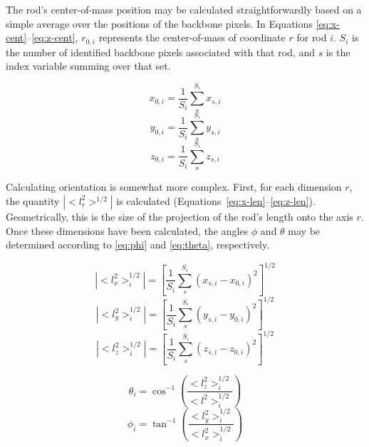 The rod's center-of-mass position may be calculated
straightforwardly based on a simple average over the positions of the backbone pixels.  In 
Equations \ref{eq:x-cent}--\ref{eq:z-cent}, $r_{0,i}$ represents the center-of-mass of coordinate $r$ for 
rod $i$.  $S_i$ is the number of identified backbone pixels associated with that rod, and $s$ is the index
variable summing over that set.

\begin{equation}
\label{eq:x-cent}
x_{0,i} = \frac{1}{S_i} \sum_{s}^{S_i} x_{s,i}
\end{equation}
\begin{equation}
\label{eq:y-cent}
y_{0,i} = \frac{1}{S_i} \sum_{s}^{S_i} y_{s,i}
\end{equation}
\begin{equation}
\label{eq:z-cent}
z_{0,i} = \frac{1}{S_i} \sum_{s}^{S_i} z_{s,i} 
\end{equation}

Calculating orientation is somewhat more complex.  First, for each dimension $r$, the quantity
$|<l_r^2>^{1/2}|$ is calculated (Equations~\ref{eq:x-len}--\ref{eq:z-len}). 
Geometrically, this is the size of the projection of the rod's length
onto the axis $r$.
Once these dimensions have been calculated, the angles $\phi$ and $\theta$ may be 
determined according to \ref{eq:phi} and \ref{eq:theta}, respectively.

\begin{equation}
\label{eq:x-len}
|<l_x^2>_i^{1/2}| = \left[\frac{1}{S_i} \sum_s^{S_i} (x_{s,i} - x_{0,i} )^2 \right]^{1/2}
\end{equation}
\begin{equation}
\label{eq:y-len}
|<l_y^2>_i^{1/2}| = \left[\frac{1}{S_i} \sum_s^{S_i} (y_{s,i} - y_{0,i} )^2 \right]^{1/2}
\end{equation}
\begin{equation}
\label{eq:z-len}
|<l_z^2>_i^{1/2}| = \left[\frac{1}{S_i} \sum_s^{S_i} (z_{s,i} - z_{0,i} )^2 \right]^{1/2}
\end{equation}

\begin{equation}
\label{eq:theta}
\theta_i = \cos^{-1} \left(\frac{<l_z^2>_i^{1/2}}{<l^2>_i^{1/2}} \right)
\end{equation}
\begin{equation}
\label{eq:phi}
\phi_i = \tan^{-1} \left(\frac{<l_y^2>_i^{1/2}}{<l_x^2>_i^{1/2}} \right)
\end{equation}

